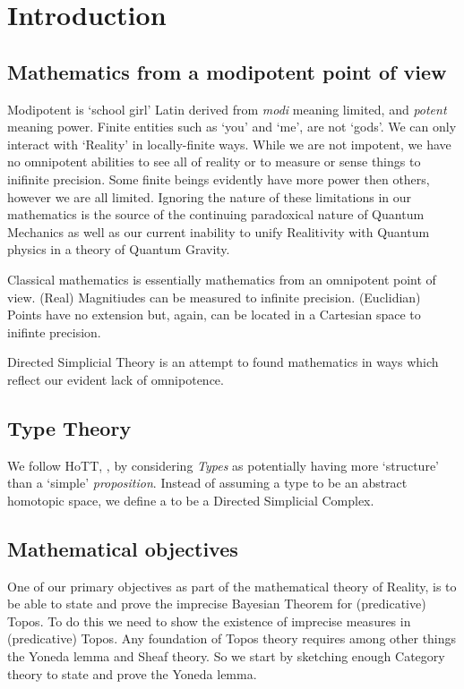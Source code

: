 \documentclass[a4paper,openany]{amsbook}
\begin{document}
\chapter{Introduction}

\section{Mathematics from a modipotent point of view}

Modipotent is `school girl' Latin derived from \emph{modi} meaning limited, and
\emph{potent} meaning power. Finite entities such as `you' and `me', are not
`gods'. We can only interact with `Reality' in locally-finite ways. While we are
not impotent, we have no omnipotent abilities to see all of reality or to
measure or sense things to inifinite precision. Some finite beings evidently
have more power then others, however we are all limited. Ignoring the nature of
these limitations in our mathematics is the source of the continuing paradoxical
nature of Quantum Mechanics as well as our current inability to unify
Realitivity with Quantum physics in a theory of Quantum Gravity.

Classical mathematics is essentially mathematics from an omnipotent point of
view. (Real) Magnitiudes can be measured to infinite precision. (Euclidian)
Points have no extension but, again, can be located in a Cartesian space to
inifinte precision.

Directed Simplicial Theory is an attempt to found mathematics in ways which
reflect our evident lack of omnipotence. 

\section{Type Theory}

We follow HoTT, \cite{HoTT}, by considering \emph{Types} as potentially having
more `structure' than a `simple' \emph{proposition}.  Instead of assuming a type
to be an abstract homotopic space, we define a  to be a Directed Simplicial Complex.

\section{Mathematical objectives}

One of our primary objectives as part of the mathematical theory of Reality, is
to be able to state and prove the imprecise Bayesian Theorem for
(predicative) Topos.  To do this we need to show the existence of imprecise
measures in (predicative) Topos. Any foundation of Topos theory requires among
other things the Yoneda lemma and Sheaf theory. So we start by sketching enough
Category theory to state and prove the Yoneda lemma.
\end{document}
